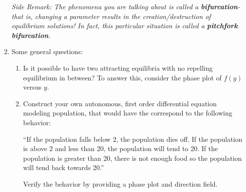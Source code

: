 \documentclass[12pt]{amsart}
\begin{document}
\begin{enumerate}
{\it Side Remark:  The phenomena you are talking about is called a
{\bf bifurcation}- that is, changing a parameter results in the
creation/destruction of equilibrium solutions!  In fact, this
particular situation is called a {\bf pitchfork bifurcation}.}
\item Some general questions:
\begin{enumerate}
\item Is it possible to have two attracting equilibria with no
repelling equilibrium in between?  To answer this, consider the
phase plot of $f(y)$ versus $y$.
\item Construct your own autonomous, first order differential
equation modeling population, that would have the correspond to
the following behavior:

``If the population falls below 2, the population dies off.  If
the population is above 2 and less than 20, the population will
tend to 20.  If the population is greater than 20, there is not
enough food so the population will tend back towards 20.''

Verify the behavior by providing a phase plot and direction field.


\end{enumerate}
\end{enumerate}
\end{document}
